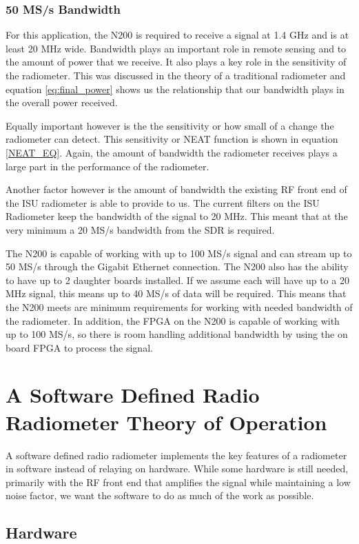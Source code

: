 \subsubsection{50 MS/s Bandwidth}
For this application, the N200 is required to receive a signal at 1.4 GHz and is at least 20 MHz wide.  Bandwidth plays an important role in remote sensing and to the amount of power that we receive.  It also plays a key role in the sensitivity of the radiometer.  This was discussed in the theory of a traditional radiometer and equation \ref{eq:final_power} shows us the relationship that our bandwidth plays in the overall power received.    

Equally important however is the the sensitivity or how small of a change the radiometer can detect.  This sensitivity or NEAT function is shown in equation \ref{NEAT_EQ}.  Again, the amount of bandwidth the radiometer receives plays a large part in the performance of the radiometer.  

Another factor however is the amount of bandwidth the existing RF front end of the ISU radiometer is able to provide to us.  The current filters on the ISU Radiometer keep the bandwidth of the signal to 20 MHz.  This meant that at the very minimum a 20 MS/s bandwidth from the SDR is required.  

The N200 is capable of working with up to 100 MS/s signal and can stream up to 50 MS/s through the Gigabit Ethernet connection.  The N200 also has the ability to have up to 2 daughter boards installed.  If we assume each will have up to a 20 MHz signal, this means up to 40 MS/s of data will be required.  This means that the N200 meets are minimum requirements for working with needed bandwidth of the radiometer.  In addition, the FPGA on the N200 is capable of working with up to 100 MS/s, so there is room handling additional bandwidth by using the on board FPGA to process the signal.

\section{A Software Defined Radio Radiometer Theory of Operation}
A software defined radio radiometer implements the key features of a radiometer in software instead of relaying on hardware.  While some hardware is still needed, primarily with the RF front end that amplifies the signal while maintaining a low noise factor, we want the software to do as much of the work as possible.  

\subsection{Hardware}

